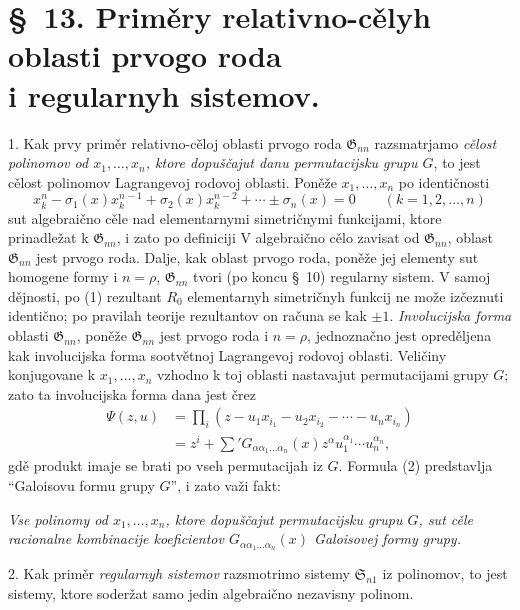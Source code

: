 \documentclass[11pt]{article}
\providecommand{\Ssys}{\mathfrak{S}}
\providecommand{\Gdom}{\mathfrak{G}}
\begin{document}
\section*{\S\ 13. Priměry relativno-cělyh oblasti prvogo roda\\ i regularnyh sistemov.}

1. Kak prvy priměr relativno-cěloj oblasti prvogo roda $\Gdom_{nn}$ razsmatrjamo {\itshape cělost polinomov od $x_1,\ldots,x_n$, ktore dopuščajut danu permutacijsku grupu $G$}, to jest cělost polinomov Lagrangevoj rodovoj oblasti. Poněže $x_1,\ldots,x_n$ po identičnosti
\begin{equation}
  x_k^n-\sigma_1(x)x_k^{n-1}+\sigma_2(x)x_k^{n-2}+\cdots\pm\sigma_n(x)=0
  \qquad(k=1,2,\ldots,n)
\tag{1}
\end{equation}
sut algebraično cěle nad elementarnymi simetričnymi funkcijami, ktore prinadležat k $\Gdom_{nn}$, i zato po definiciji V algebraično cělo zavisat od $\Gdom_{nn}$, oblast $\Gdom_{nn}$ jest prvogo roda. Dalje, kak oblast prvogo roda, poněže jej elementy sut homogene formy i $n=\rho$, $\Gdom_{nn}$ tvori (po koncu \S\ 10) regularny sistem. V samoj dějnosti, po (1) rezultant $R_0$ elementarnyh simetričnyh funkcij ne može izčeznuti identično; po pravilah teorije rezultantov on računa se kak $\pm1$. {\itshape Involucijska forma} oblasti $\Gdom_{nn}$, poněže $\Gdom_{nn}$ jest prvogo roda i $n=\rho$, jednoznačno jest opreděljena kak involucijska forma sootvětnoj Lagrangevoj rodovoj oblasti. Veličiny konjugovane k $x_1,\ldots,x_n$ vzhodno k toj oblasti nastavajut permutacijami grupy $G$; zato ta involucijska forma dana jest črez
\begin{equation}
\begin{aligned}
  \Psi(z,u)&=\prod_i
  (z-u_1x_{i_1}-u_2x_{i_2}-\cdots-u_nx_{i_n})\\
  &=z^i+\sum{}'G_{\alpha\alpha_1\ldots\alpha_n}(x)
  z^\alpha u_1^{\alpha_1}\cdots u_n^{\alpha_n},
\end{aligned}
\tag{2}
\end{equation}
gdě produkt imaje se brati po vseh permutacijah iz $G$. Formula (2) predstavlja ``Galoisovu formu grupy $G$'', i zato važi fakt:

{\itshape Vse polinomy od $x_1,\ldots,x_n$, ktore dopuščajut permutacijsku grupu $G$, sut cěle racionalne kombinacije koeficientov $G_{\alpha\alpha_1\ldots\alpha_n}(x)$ Galoisovej formy grupy.}

2. Kak priměr {\itshape regularnyh sistemov} razsmotrimo sistemy $\Ssys_{n1}$ iz polinomov, to jest sistemy, ktore soderžat samo jedin algebraično nezavisny polinom.
\end{document}
